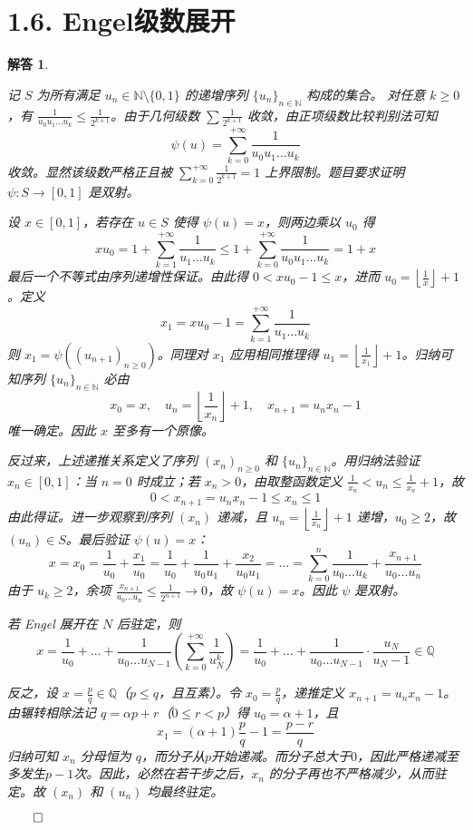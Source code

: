 \documentclass[12pt,UTF8]{ctexbook}
\theoremstyle{exercisestyle}
\theoremstyle{solutionstyle}
\newtheorem*{solution*}{解答}
\newenvironment{solution}
  {\begin{solution*}}
  {\hfill\ensuremath{\qed}\end{solution*}}
\begin{document}
\section{1.6. Engel级数展开}
\begin{solution}
\begin{subquestions}
  \item 
  记 $S$ 为所有满足 $u_n \in \mathbb{N}\setminus\{0,1\}$ 的递增序列 $\{u_n\}_{n\in\mathbb{N}}$ 构成的集合。  
  对任意 $k \geq 0$，有 $\frac{1}{u_0 u_1 \dots u_k} \leq \frac{1}{2^{k+1}}$。由于几何级数 $\sum \frac{1}{2^{k+1}}$ 收敛，由正项级数比较判别法可知  
  $$
  \psi(u) = \sum_{k=0}^{+\infty} \frac{1}{u_0 u_1 \dots u_k}
  $$
  收敛。显然该级数严格正且被 $\sum_{k=0}^{+\infty} \frac{1}{2^{k+1}} = 1$ 上界限制。题目要求证明 $\psi: S \to [0,1]$ 是双射。

  设 $x \in [0,1]$，若存在 $u \in S$ 使得 $\psi(u) = x$，则两边乘以 $u_0$ 得  
  $$
  x u_0 = 1 + \sum_{k=1}^{+\infty} \frac{1}{u_1 \dots u_k} \leq 1 + \sum_{k=0}^{+\infty} \frac{1}{u_0 u_1 \dots u_k} = 1 + x
  $$
  最后一个不等式由序列递增性保证。由此得 $0 < x u_0 - 1 \leq x$，进而 $u_0 = \left\lfloor \frac{1}{x} \right\rfloor + 1$。定义  
  $$
  x_1 = x u_0 - 1 = \sum_{k=1}^{+\infty} \frac{1}{u_1 \dots u_k}
  $$
  则 $x_1 = \psi((u_{n+1})_{n\geqslant 0})$。同理对 $x_1$ 应用相同推理得 $u_1 = \left\lfloor \frac{1}{x_1} \right\rfloor + 1$。归纳可知序列 $\{u_n\}_{n\in\mathbb{N}}$ 必由  
  $$
  x_0 = x,\quad u_n = \left\lfloor \frac{1}{x_n} \right\rfloor + 1,\quad x_{n+1} = u_n x_n - 1
  $$
  唯一确定。因此 $x$ 至多有一个原像。

  反过来，上述递推关系定义了序列 $(x_n)_{n\geqslant 0}$ 和 $\{u_n\}_{n\in\mathbb{N}}$。用归纳法验证 $x_n \in [0,1]$：当 $n=0$ 时成立；若 $x_n > 0$，由取整函数定义 $\frac{1}{x_n} < u_n \leq \frac{1}{x_n} + 1$，故  
  $$
  0 < x_{n+1} = u_n x_n - 1 \leq x_n \leq 1
  $$
  由此得证。进一步观察到序列 $(x_n)$ 递减，且 $u_n = \left\lfloor \frac{1}{x_n} \right\rfloor + 1$ 递增，$u_0 \geq 2$，故 $(u_n) \in S$。最后验证 $\psi(u) = x$：  
  $$
  x = x_0 = \frac{1}{u_0} + \frac{x_1}{u_0} = \frac{1}{u_0} + \frac{1}{u_0 u_1} + \frac{x_2}{u_0 u_1} = \dots = \sum_{k=0}^n \frac{1}{u_0 \dots u_k} + \frac{x_{n+1}}{u_0 \dots u_n}
  $$
  由于 $u_k \geq 2$，余项 $\frac{x_{n+1}}{u_0 \dots u_n} \leq \frac{1}{2^{n+1}} \to 0$，故 $\psi(u) = x$。因此 $\psi$ 是双射。

  \item 
  若 Engel 展开在 $N$ 后驻定，则  
  $$
  x = \frac{1}{u_0} + \dots + \frac{1}{u_0 \dots u_{N-1}} \left( \sum_{k=0}^{+\infty} \frac{1}{u_N^k} \right) = \frac{1}{u_0} + \dots + \frac{1}{u_0 \dots u_{N-1}} \cdot \frac{u_N}{u_N - 1} \in \mathbb{Q}
  $$
  
  反之，设 $x = \frac{p}{q} \in \mathbb{Q}$（$p \leq q$，且互素）。令 $x_0 = \frac{p}{q}$，递推定义 $x_{n+1} = u_n x_n - 1$。由辗转相除法记 $q = \alpha p + r$（$0 \leq r < p$）得 $u_0 = \alpha + 1$，且  
  $$
  x_1 = (\alpha + 1)\frac{p}{q} - 1 = \frac{p - r}{q}
  $$
  归纳可知 $x_n$ 分母恒为 $q$，而分子从$p$开始递减。而分子总大于$0$，因此严格递减至多发生$p-1$次。因此，必然在若干步之后，$x_n$ 的分子再也不严格减少，从而驻定。故 $(x_n)$ 和 $(u_n)$ 均最终驻定。  
\end{subquestions}
\end{solution}
\end{document}
